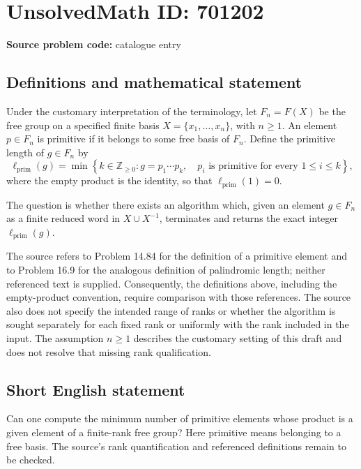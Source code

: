\documentclass[11pt]{article}
\newcommand{\Z}{\mathbb{Z}}
\begin{document}
\section*{UnsolvedMath ID: 701202}
\textbf{Source problem code:} catalogue entry
\subsection{Definitions and mathematical statement}
Under the customary interpretation of the terminology, let \(F_n=F(X)\) be the free group on a specified finite basis \(X=\{x_1,\ldots,x_n\}\), with \(n\geq 1\). An element \(p\in F_n\) is primitive if it belongs to some free basis of \(F_n\). Define the primitive length of \(g\in F_n\) by
\[
\ell_{\mathrm{prim}}(g)=\min\left\{k\in\Z_{\geq 0}: g=p_1\cdots p_k,\quad p_i\text{ is primitive for every }1\leq i\leq k\right\},
\]
where the empty product is the identity, so that \(\ell_{\mathrm{prim}}(1)=0\).

The question is whether there exists an algorithm which, given an element \(g\in F_n\) as a finite reduced word in \(X\cup X^{-1}\), terminates and returns the exact integer \(\ell_{\mathrm{prim}}(g)\).

The source refers to Problem 14.84 for the definition of a primitive element and to Problem 16.9 for the analogous definition of palindromic length; neither referenced text is supplied. Consequently, the definitions above, including the empty-product convention, require comparison with those references. The source also does not specify the intended range of ranks or whether the algorithm is sought separately for each fixed rank or uniformly with the rank included in the input. The assumption \(n\geq 1\) describes the customary setting of this draft and does not resolve that missing rank qualification.
\subsection{Short English statement}
Can one compute the minimum number of primitive elements whose product is a given element of a finite-rank free group? Here primitive means belonging to a free basis. The source's rank quantification and referenced definitions remain to be checked.
\end{document}
